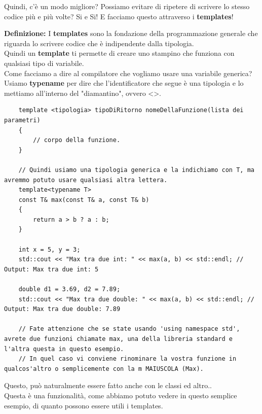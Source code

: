 \textsf{\small Quindi, c'è un modo migliore? Possiamo evitare di ripetere di scrivere lo stesso codice più e più volte? Si e Si! E facciamo questo attraverso i \textbf{templates}!} \break

\textsf{\small \textbf{Definizione:} I \textbf{templates} sono la fondazione della programmazione generale che riguarda lo scrivere codice che è indipendente dalla tipologia. } \\

\textsf{\small Quindi un \textbf{template} ti permette di creare uno stampino che funziona con qualsiasi tipo di variabile.} \\

\textsf{\small Come facciamo a dire al compilatore che vogliamo usare una variabile generica? Usiamo \textbf{typename} per dire che l'identificatore che segue è una tipologia e lo mettiamo all'interno del "diamantino", ovvero <>.} \\

\textsf{\small }

\begin{lstlisting}
	template <tipologia> tipoDiRitorno nomeDellaFunzione(lista dei parametri)
	{
		// corpo della funzione.
	}

	// Quindi usiamo una tipologia generica e la indichiamo con T, ma avremmo potuto usare qualsiasi altra lettera.
	template<typename T>
	const T& max(const T& a, const T& b)
	{
		return a > b ? a : b;
	}

	int x = 5, y = 3;
	std::cout << "Max tra due int: " << max(a, b) << std::endl; // Output: Max tra due int: 5
	
	double d1 = 3.69, d2 = 7.89;
	std::cout << "Max tra due double: " << max(a, b) << std::endl; // Output: Max tra due double: 7.89
	
	// Fate attenzione che se state usando 'using namespace std', avrete due funzioni chiamate max, una della libreria standard e l'altra questa in questo esempio.
	// In quel caso vi conviene rinominare la vostra funzione in qualcos'altro o semplicemente con la m MAIUSCOLA (Max).
\end{lstlisting}

\textsf{\small Questo, può naturalmente essere fatto anche con le classi ed altro..} \\

\textsf{\small Questa è una funzionalità, come abbiamo potuto vedere in questo semplice esempio, di quanto possono essere utili i templates.} \\


